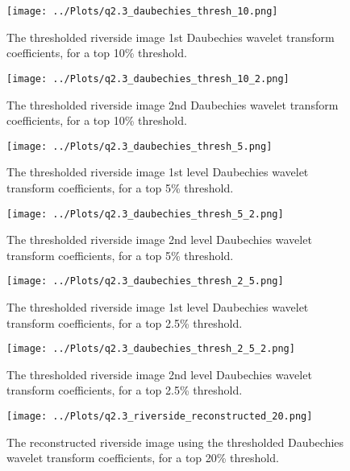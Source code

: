 \documentclass[12pt]{report} %
\begin{document}
\begin{figure}[htbp]
    \centering
    \texttt{[image: ../Plots/q2.3\_daubechies\_thresh\_10.png]}
    \caption{The thresholded riverside image 1st Daubechies wavelet transform coefficients, for a top 10\% threshold.}
    \label{fig:thresholded_image10}
\end{figure}

\begin{figure}[htbp]
    \centering
    \texttt{[image: ../Plots/q2.3\_daubechies\_thresh\_10\_2.png]}
    \caption{The thresholded riverside image 2nd Daubechies wavelet transform coefficients, for a top 10\% threshold.}
    \label{fig:thresholded_image10_2}
\end{figure}

\begin{figure}[htbp]
    \centering
    \texttt{[image: ../Plots/q2.3\_daubechies\_thresh\_5.png]}
    \caption{The thresholded riverside image 1st level Daubechies wavelet transform coefficients, for a top 5\% threshold.}
    \label{fig:thresholded_image5}
\end{figure}

\begin{figure}[htbp]
    \centering
    \texttt{[image: ../Plots/q2.3\_daubechies\_thresh\_5\_2.png]}
    \caption{The thresholded riverside image 2nd level Daubechies wavelet transform coefficients, for a top 5\% threshold.}
    \label{fig:thresholded_image5_2}
\end{figure}

\begin{figure}[htbp]
    \centering
    \texttt{[image: ../Plots/q2.3\_daubechies\_thresh\_2\_5.png]}
    \caption{The thresholded riverside image 1st level Daubechies wavelet transform coefficients, for a top 2.5\% threshold.}
    \label{fig:thresholded_image2.5}
\end{figure}

\begin{figure}[htbp]
    \centering
    \texttt{[image: ../Plots/q2.3\_daubechies\_thresh\_2\_5\_2.png]}
    \caption{The thresholded riverside image 2nd level Daubechies wavelet transform coefficients, for a top 2.5\% threshold.}
    \label{fig:thresholded_image2.5_2}
\end{figure}


\begin{figure}[htbp]
    \centering
    \texttt{[image: ../Plots/q2.3\_riverside\_reconstructed\_20.png]}
    \caption{The reconstructed riverside image using the thresholded Daubechies wavelet transform coefficients, for a top 20\% threshold.}
    \label{fig:reconstructed_image20}
\end{figure}
\end{document}
